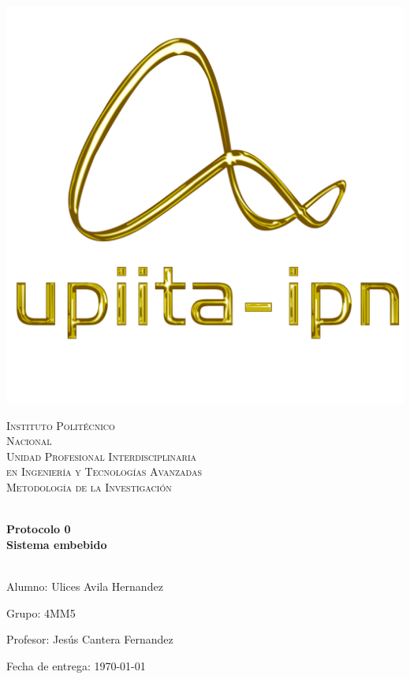 \begin{center}
\begin{minipage}{0.48\textwidth} 
	\begin{flushright}
		\includegraphics[scale = 0.3]{images/logo_upiita_oro.png}
	\end{flushright}
\end{minipage}


\vspace*{-25mm}  %
\textsc{\Huge Instituto Polit\'ecnico\\ \vspace{15pt} Nacional}\\[20mm]

\textsc{\huge Unidad Profesional Interdisciplinaria\\  \vspace{10pt} en Ingenier\'ia y Tecnolog\'ias Avanzadas}\\[20mm]

\textsc{\LARGE Metodología de la Investigación}


\vspace*{10mm}
\HRule \\[4mm]
{ \huge \bfseries Protocolo 0\\}\vspace{5mm}
{\LARGE \bfseries Sistema embebido}\\[4mm]
\HRule \\[15mm]

\begin{flushleft}
	\Large Alumno: Ulices Avila Hernandez
\end{flushleft}
\vspace{5mm}
\begin{flushleft}
	\Large Grupo: 4MM5
\end{flushleft}
\vspace{5mm}
\begin{flushleft}
	\Large Profesor: Jesús Cantera Fernandez
\end{flushleft}
\vspace{25mm}

{\large Fecha de entrega: \today}

\end{center}